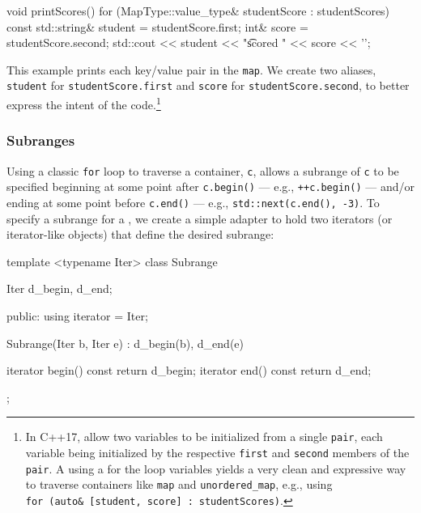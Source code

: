 {{\begin{emcppslisting}
void printScores()
{
    for (MapType::value_type& studentScore : studentScores)
    {
        const std::string& student = studentScore.first;
        int&               score   = studentScore.second;
        std::cout << student << "\t scored " << score << '\n';
    }
}
\end{emcppslisting}


\noindent This example prints each key/value pair in the \lstinline!map!. We create
two aliases, \lstinline!student! for \lstinline!studentScore.first! and
\lstinline!score! for \lstinline!studentScore.second!, to better express the
intent of the code.{\cprotect\footnote{In C++17,  allow two variables to be initialized from a single
\lstinline!pair!, each variable being initialized by the respective
\lstinline!first! and \lstinline!second! members of the \lstinline!pair!. A
 using a  for the loop variables yields a very clean and expressive way
to traverse containers like \lstinline!map! and \lstinline!unordered_map!,
e.g., using
  \lstinline!for!~\lstinline!(auto&!~\lstinline![student,!~\lstinline!score]!~\lstinline!:!~\lstinline!studentScores)!.}}

\subsubsection[Subranges]{Subranges}\label{subranges}

Using a classic \lstinline!for! loop to traverse a container, \lstinline!c!,
allows a subrange of \lstinline!c! to be specified beginning at some point
after \lstinline!c.begin()! --- e.g., \lstinline!++c.begin()! --- and/or ending at
some point before \lstinline!c.end()! --- e.g.,
\lstinline!std::next(c.end(),!~\lstinline!-3)!. To specify a subrange for a
, we create a simple adapter to
hold two iterators (or iterator-like objects) that define the desired
subrange:

\begin{emcppslisting}[emcppsbatch=e2]
template <typename Iter>
class Subrange
{
    Iter d_begin, d_end;

public:
    using iterator = Iter;

    Subrange(Iter b, Iter e) : d_begin(b), d_end(e) { }

    iterator begin() const { return d_begin; }
    iterator end()   const { return d_end;   }
};


\end{emcppslisting}}}
